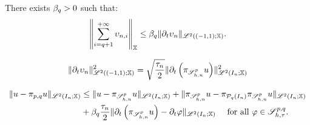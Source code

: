 \begin{lemma}
    There exists $\beta_{q} > 0$ such that:
    \begin{gather}
        \left\lVert \sum_{i = q + 1}^{+\infty} \upsilon_{n, i} \right\rVert_{\mathbb{X}} \leq \beta_{q} \lVert \partial_t \upsilon_n \rVert_{\mathscr{L}^{2}((-1, 1); \mathbb{X})}.
    \end{gather}
\end{lemma}

\begin{lemma}
    \begin{gather}
        \lVert \partial_t \upsilon_n \rVert_{\mathscr{L}^{2}((-1, 1); \mathbb{X})}^2 = \sqrt{\frac{\tau_n}{2}} \lVert \partial_t \left( \pi_{\mathscr{S}^p_{h, n}} u \right) \rVert_{\mathscr{L}^{2}(I_n; \mathbb{X})}^2
    \end{gather}
\end{lemma}

\begin{lemma}
    \begin{align}
        \lVert u - \pi_{p, q} u \rVert_{\mathscr{L}^{2}(I_n; \mathbb{X})} &\leq \lVert u - \pi_{\mathscr{S}^p_{h, n}} u \rVert_{\mathscr{L}^{2}(I_n; \mathbb{X})} + \lVert \pi_{\mathscr{S}^p_{h, n}} u - \pi_{\mathcal{P}_{q}(I_n)} \pi_{\mathscr{S}^p_{h, n}} u \rVert_{\mathscr{L}^{2}(I_n; \mathbb{X})} \\
        &+ \beta_{q} \frac{\tau_n}{2} \lVert \partial_t \left( \pi_{\mathscr{S}^p_{h, n}} u \right) - \partial_t \varphi \rVert_{\mathscr{L}^{2}(I_n; \mathbb{X})} \quad \text{ for all } \varphi \in \mathscr{S}^{p, q}_{h, \tau}. \notag
    \end{align}
\end{lemma}